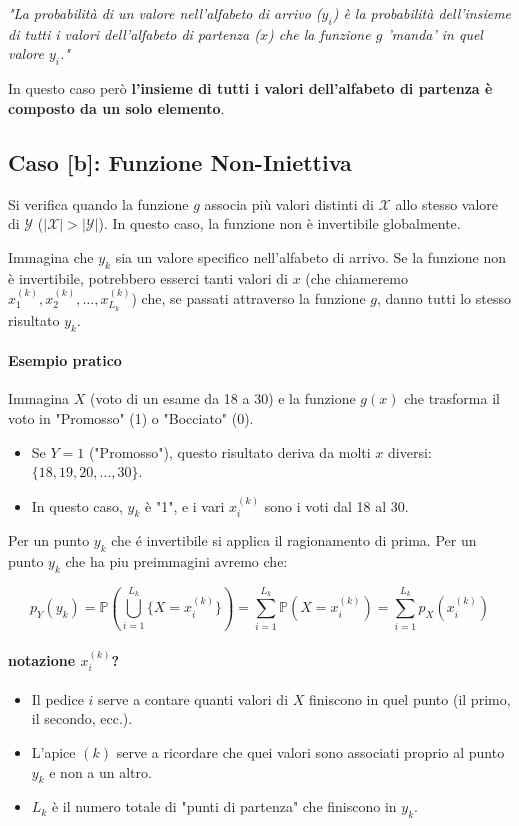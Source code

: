 \textit{"La probabilità di un valore nell'alfabeto di arrivo ($y_i$) è la probabilità dell'insieme di tutti i valori dell'alfabeto di partenza ($x$) che la funzione $g$ 'manda' in quel valore $y_i$."}

In questo caso però \textbf{l'insieme di tutti i valori dell'alfabeto di partenza è composto da un solo elemento}.

\subsection{Caso [b]: Funzione Non-Iniettiva}

Si verifica quando la funzione $g$ associa più valori distinti di $\mathcal{X}$ allo stesso valore di $\mathcal{Y}$ ($|\mathcal{X}| > |\mathcal{Y}|$). In questo caso, la funzione non è invertibile globalmente.

Immagina che $y_k$ sia un valore specifico nell'alfabeto di arrivo. Se la funzione non è invertibile, potrebbero esserci tanti valori di $x$ (che chiameremo $x_1^{(k)}, x_2^{(k)}, \dots, x_{L_k}^{(k)}$) che, se passati attraverso la funzione $g$, danno tutti lo stesso risultato $y_k$.

\paragraph{Esempio pratico}
Immagina $X$ (voto di un esame da 18 a 30) e la funzione $g(x)$ che trasforma il voto in "Promosso" (1) o "Bocciato" (0).
\begin{itemize}
    \item Se $Y = 1$ ("Promosso"), questo risultato deriva da molti $x$ diversi: $\{18, 19, 20, \dots, 30\}$.
    \item In questo caso, $y_k$ è "1", e i vari $x_i^{(k)}$ sono i voti dal 18 al 30.
\end{itemize}
Per un punto $y_k$ che é invertibile si applica il ragionamento di prima. 
\newpage
Per un punto $y_k$ che ha piu preimmagini avremo che:

\begin{equation}
\boxed{p_Y(y_k) = \mathbb{P}\left( \bigcup_{i=1}^{L_k} \{X = x_i^{(k)}\} \right) = \sum_{i=1}^{L_k} \mathbb{P}(X = x_i^{(k)}) = \sum_{i=1}^{L_k} p_X(x_i^{(k)})}
\end{equation}

\paragraph{notazione $x_i^{(k)}$?}
\begin{itemize}
    \item Il pedice $i$ serve a contare quanti valori di $X$ finiscono in quel punto (il primo, il secondo, ecc.).
    \item L'apice $(k)$ serve a ricordare che quei valori sono associati proprio al punto $y_k$ e non a un altro.
    \item $L_k$ è il numero totale di "punti di partenza" che finiscono in $y_k$.
\end{itemize}

